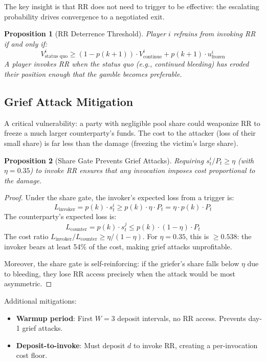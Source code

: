 \documentclass[12pt,a4paper]{article}
\newtheorem{proposition}{Proposition}
\begin{document}
The key insight is that RR does not need to trigger to be effective: the escalating probability drives convergence to a negotiated exit.

\begin{proposition}[RR Deterrence Threshold]
\label{prop:rr-deterrence}
Player $i$ refrains from invoking RR if and only if:
\[
V_{\text{status quo}}^i \geq (1 - p(k+1)) \cdot V_{\text{continue}}^i + p(k+1) \cdot u_{\text{frozen}}^i
\]
A player invokes RR when the status quo (e.g., continued bleeding) has eroded their position enough that the gamble becomes preferable.
\end{proposition}

\subsection{Grief Attack Mitigation}
\label{sec:grief}

A critical vulnerability: a party with negligible pool share could weaponize RR to freeze a much larger counterparty's funds. The cost to the attacker (loss of their small share) is far less than the damage (freezing the victim's large share).

\begin{proposition}[Share Gate Prevents Grief Attacks]
\label{prop:share-gate}
Requiring $s_t^i / P_t \geq \eta$ (with $\eta = 0.35$) to invoke RR ensures that any invocation imposes cost proportional to the damage.
\end{proposition}

\begin{proof}
Under the share gate, the invoker's expected loss from a trigger is:
\[
L_{\text{invoker}} = p(k) \cdot s_t^i \geq p(k) \cdot \eta \cdot P_t = \eta \cdot p(k) \cdot P_t
\]
The counterparty's expected loss is:
\[
L_{\text{counter}} = p(k) \cdot s_t^j \leq p(k) \cdot (1-\eta) \cdot P_t
\]
The cost ratio $L_{\text{invoker}} / L_{\text{counter}} \geq \eta / (1-\eta)$. For $\eta = 0.35$, this is $\geq 0.538$: the invoker bears at least 54\% of the cost, making grief attacks unprofitable.

Moreover, the share gate is self-reinforcing: if the griefer's share falls below $\eta$ due to bleeding, they lose RR access precisely when the attack would be most asymmetric.
\end{proof}

Additional mitigations:
\begin{itemize}
\item \textbf{Warmup period}: First $W = 3$ deposit intervals, no RR access. Prevents day-1 grief attacks.
\item \textbf{Deposit-to-invoke}: Must deposit $d$ to invoke RR, creating a per-invocation cost floor.
\end{itemize}
\end{document}
